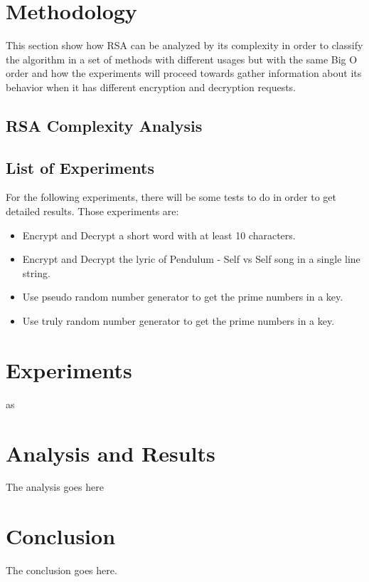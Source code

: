 \documentclass[conference,compsoc, 10pt]{IEEEtran}
\begin{document}
\section{Methodology}
This section show how RSA can be analyzed by its complexity in order to classify the algorithm in a set of methods with different usages but with the same Big O order and how the experiments will proceed towards gather information about its behavior when it has different encryption and decryption requests.

\subsection{RSA Complexity Analysis}


\subsection{List of Experiments}
For the following experiments, there will be some tests to do in order to get detailed results. Those experiments are:

\begin{itemize}
	\item Encrypt and Decrypt a short word with at least 10 characters.
	\item Encrypt and Decrypt the lyric of Pendulum - Self vs Self song in a single line string.
	\item Use pseudo random number generator to get the prime numbers in a key.
	\item Use truly random number generator to get the prime numbers in a key.
\end{itemize}


\section{Experiments}
as

\section{Analysis and Results}
The analysis goes here

\section{Conclusion}
The conclusion goes here.
\end{document}
